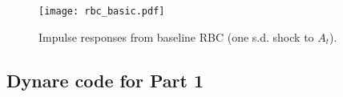 \documentclass[a4paper,12pt]{article} %
\theoremstyle{nonitalic}
\begin{document}

\begin{figure}[H]
  \centering
  \texttt{[image: rbc\_basic.pdf]}
  \caption{Impulse responses from baseline RBC (one s.d. shock to $A_t$).}
  \label{fig:rbc_basic_irf}
\end{figure}
\FloatBarrier

\subsection*{Dynare code for Part 1}



\pagebreak
\end{document}
